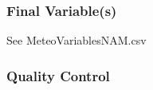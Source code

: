 \begin{enumerate}






\end{enumerate}

\subsubsection*{Final Variable(s)}
See MeteoVariablesNAM.csv

\subsubsection*{Quality Control}



